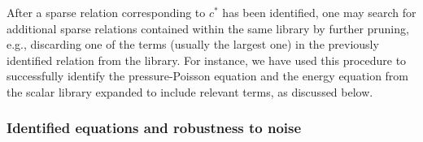 \documentclass[preprint]{article}
\def\bi#1{\textbf{#1}}
\begin{document}
After a sparse relation corresponding to $c^*$ has been identified, one may search for additional sparse relations contained within the same library by further pruning, e.g., discarding one of the terms (usually the largest one) in the previously identified relation from the library. 
For instance, we have used this procedure to successfully identify the pressure-Poisson equation and the energy equation from the scalar library expanded to include relevant terms, as discussed below. 


\subsubsection{Identified equations and robustness to noise} 

\end{document}

